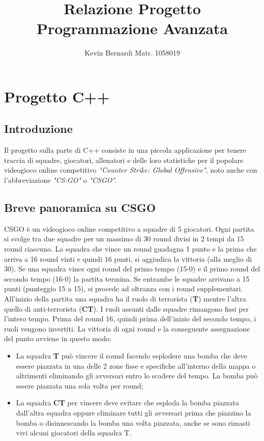 \documentclass[a4paper, 11pt]{article}
\title{Relazione Progetto Programmazione Avanzata}
\author{Kevin Bernardi Matr. 1058019}
\date{}
\begin{document}
\maketitle
\section{Progetto C++}
\subsection{Introduzione}
Il progetto sulla parte di C++ consiste in una piccola applicazione per tenere traccia di squadre, giocatori, allenatori e delle loro statistiche per il popolare videogioco online competitivo \textit{"Counter Strike: Global Offensive"}, noto anche con l'abbreviazione \textit{"CS:GO"} o \textit{"CSGO"}.

\subsection{Breve panoramica su CSGO}
CSGO è un videogioco online competitivo a squadre di 5 giocatori. Ogni partita si svolge tra due squadre per un massimo di 30 round divisi in 2 tempi da 15 round ciascuno.
La squadra che vince un round guadagna 1 punto e la prima che arriva a 16 round vinti e quindi 16 punti, si aggiudica la vittoria (alla meglio di 30). Se una squadra vince ogni round del primo tempo (15-0) e il primo round del secondo tempo (16-0) la partita termina. Se entrambe le squadre arrivano a 15 punti (punteggio 15 a 15), si procede ad oltranza con i round supplementari.
All'inizio della partita una squadra ha il ruolo di terrorista (\textbf{T}) mentre l'altra quello di anti-terrorista (\textbf{CT}). I ruoli assunti dalle squadre rimangono fissi per l'intero tempo. Prima del round 16, quindi prima dell'inizio del secondo tempo, i ruoli vengono invertiti.
La vittoria di ogni round e la conseguente assegnazione del punto avviene in questo modo:
\begin{itemize}
\item La squadra \textbf{T} può vincere il round facendo esplodere una bomba che deve essere piazzata in una delle 2 zone fisse e specifiche all'interno della mappa o altrimenti eliminando gli avversari entro lo scadere del tempo. La bomba può essere piazzata una sola volta per round;

\item La squadra \textbf{CT} per vincere deve evitare che esploda la bomba piazzata dall'altra squadra oppure eliminare tutti gli avversari prima che piazzino la bomba o disinnescando la bomba una volta piazzata, anche se sono rimasti vivi alcuni giocatori della squadra T.
\end{itemize}
\end{document}
